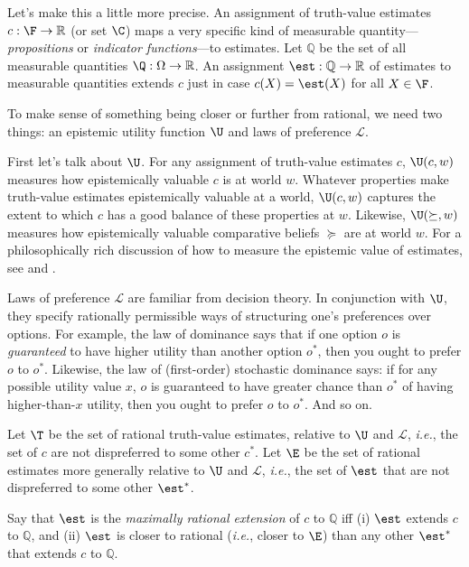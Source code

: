 Let's make this a little more precise. An assignment of truth-value estimates $c:\F\rightarrow\mathbb{R}$ (or set $\C$) maps a very specific kind of measurable quantity---\textit{propositions} or \textit{indicator functions}---to estimates. Let $\mathbb{Q}$ be the set of all measurable quantities $\Q:\Omega\rightarrow\mathbb{R}$. An assignment $\est:\mathbb{Q}\rightarrow\mathbb{R}$ of estimates to measurable quantities extends $c$ just in case $c(X)=\est(X)$ for all $X\in\F$.

To make sense of something being closer or further from rational, we need two things: an epistemic utility function $\U$ and laws of preference $\mathcal{L}$.

First let's talk about $\U$. For any assignment of truth-value estimates $c$, $\U(c,w)$ measures how epistemically valuable $c$ is at world $w$. Whatever properties make truth-value estimates epistemically valuable at a world, $\U(c,w)$ captures the extent to which $c$ has a good balance of these properties at $w$. Likewise, $\U(\succeq,w)$ measures how epistemically valuable comparative beliefs $\succeq$ are at world $w$. For a philosophically rich discussion of how to measure the epistemic value of estimates, see \citet{Joyce2009} and \citet{Pettigrew2016}.

Laws of preference $\mathcal{L}$ are familiar from decision theory. In conjunction with $\U$, they specify rationally permissible ways of structuring one's preferences over options. For example, the law of dominance says that if one option $o$ is \textit{guaranteed} to have higher utility than another option $o^*$, then you ought to prefer $o$ to $o^*$. Likewise, the law of (first-order) stochastic dominance says: if for any possible utility value $x$, $o$ is guaranteed to have greater chance than $o^*$ of having higher-than-$x$ utility, then you ought to prefer $o$ to $o^*$. And so on.

Let $\T$ be the set of rational truth-value estimates, relative to $\U$ and $\mathcal{L}$, \textit{i.e.}, the set of $c$ are not dispreferred to some other $c^*$. Let $\E$ be the set of rational estimates more generally relative to $\U$ and $\mathcal{L}$, \textit{i.e.}, the set of $\est$ that are not dispreferred to some other $\est^*$.

Say that $\est$ is the \textit{maximally rational extension} of $c$ to $\mathbb{Q}$ iff (i) $\est$ extends $c$ to $\mathbb{Q}$, and (ii) $\est$ is closer to rational (\textit{i.e.}, closer to $\E$) than any other $\est^*$ that extends $c$ to $\mathbb{Q}$.

